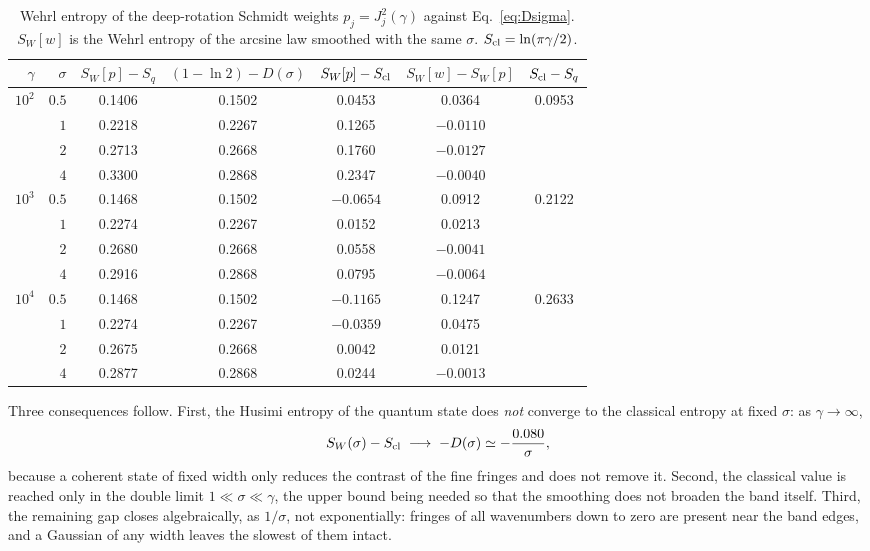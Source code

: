 \documentclass[preprint,12pt]{elsarticle}
\newcommand{\Scl}{S_{\rm cl}}
\newcommand{\SW}{S_{W}}
\begin{document}
\begin{table}[t]
\centering
\caption{Wehrl entropy of the deep-rotation Schmidt weights $p_{j}=J_{j}^{2}(\gamma)$
against Eq.~\eqref{eq:Dsigma}. $\SW[w]$ is the Wehrl entropy of the arcsine law
smoothed with the same $\sigma$. $\Scl=\ln(\pi\gamma/2)$.}
\label{tab:husimi_rot}
\small
\renewcommand{\arraystretch}{1.12}
\begin{tabular}{rr cccc c}
\toprule
$\gamma$ & $\sigma$ & $\SW[p]-S_{q}$ & $(1-\ln2)-D(\sigma)$ & $\SW[p]-\Scl$ &
$\SW[w]-\SW[p]$ & $\Scl-S_{q}$\\
\midrule
$10^{2}$ & $0.5$ & 0.1406 & 0.1502 & 0.0453 & 0.0364 & \multirow{4}{*}{0.0953}\\
         & $1$   & 0.2218 & 0.2267 & 0.1265 & $-0.0110$ & \\
         & $2$   & 0.2713 & 0.2668 & 0.1760 & $-0.0127$ & \\
         & $4$   & 0.3300 & 0.2868 & 0.2347 & $-0.0040$ & \\
\midrule
$10^{3}$ & $0.5$ & 0.1468 & 0.1502 & $-0.0654$ & 0.0912 & \multirow{4}{*}{0.2122}\\
         & $1$   & 0.2274 & 0.2267 & 0.0152 & 0.0213 & \\
         & $2$   & 0.2680 & 0.2668 & 0.0558 & $-0.0041$ & \\
         & $4$   & 0.2916 & 0.2868 & 0.0795 & $-0.0064$ & \\
\midrule
$10^{4}$ & $0.5$ & 0.1468 & 0.1502 & $-0.1165$ & 0.1247 & \multirow{4}{*}{0.2633}\\
         & $1$   & 0.2274 & 0.2267 & $-0.0359$ & 0.0475 & \\
         & $2$   & 0.2675 & 0.2668 & 0.0042 & 0.0121 & \\
         & $4$   & 0.2877 & 0.2868 & 0.0244 & $-0.0013$ & \\
\bottomrule
\end{tabular}
\end{table}

Three consequences follow. First, the Husimi entropy of the quantum state does
\emph{not} converge to the classical entropy at fixed $\sigma$: as
$\gamma\to\infty$,
\begin{equation}
\SW(\sigma)-\Scl\;\longrightarrow\;-D(\sigma)\simeq-\frac{0.080}{\sigma},
\label{eq:SWScl}
\end{equation}
because a coherent state of fixed width only reduces the contrast of the fine
fringes and does not remove it. Second, the classical value is reached only in
the double limit $1\ll\sigma\ll\gamma$, the upper bound being needed so that
the smoothing does not broaden the band itself. Third, the remaining gap closes
algebraically, as $1/\sigma$, not exponentially: fringes of all wavenumbers
down to zero are present near the band edges, and a Gaussian of any width
leaves the slowest of them intact.
\end{document}
